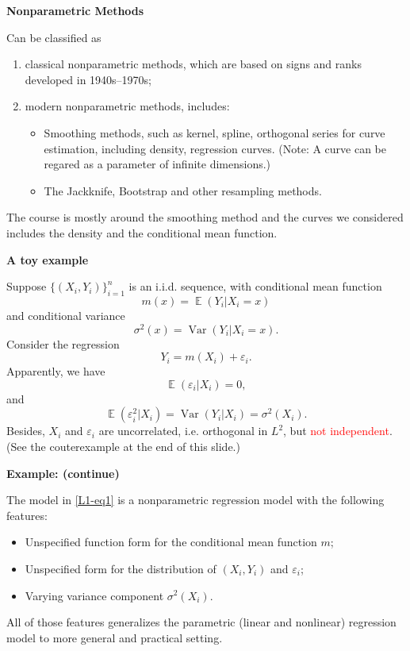 \documentclass[19pt,landscaoe]{article}
\DeclareMathOperator{\E}{\mathbb{E}}
\DeclareMathOperator{\Var}{\mathrm{Var}}
\begin{document}
\newpage
{\LARGE\centerline{\textbf{Nonparametric Methods}}}
\vskip25pt
\begin{minipage}{.9\textwidth}
    \Large Can be classified as 
\begin{enumerate}
\item classical nonparametric methods, which are based on signs and ranks developed in 1940s--1970s;
\item modern nonparametric methods, includes:
\begin{itemize}
    \item Smoothing methods, such as kernel, spline, orthogonal series for curve estimation, including density, regression curves. (Note: A curve can be regared as a parameter of infinite dimensions.)
    \item The Jackknife, Bootstrap and other resampling methods. 
\end{itemize}
\end{enumerate}
The course is mostly around the smoothing method and the curves we considered includes the density 
    and the conditional mean function.
\end{minipage}

\newpage
{\LARGE\centerline{\textbf{A toy example}}}
\vskip25pt
\begin{minipage}{.9\textwidth}
    \Large 
Suppose $\big\{(X_i,Y_i)\big\}_{i=1}^n$ is an i.i.d. sequence, with conditional mean function
$$m(x)=\E(Y_i|X_i=x)$$ 
and conditional variance $$\sigma^2(x)=\Var(Y_i|X_i=x).$$
Consider the regression 
\begin{equation}\label{L1-eq1}
    Y_i=m(X_i)+\varepsilon_i.
\end{equation}
Apparently, we have 
$$\E(\varepsilon_i|X_i)=0,$$ and
$$\E(\varepsilon_i^2|X_i)=\Var(Y_i|X_i)=\sigma^2(X_i).$$
Besides, $X_i$ and $\varepsilon_i$ are uncorrelated, i.e. orthogonal in $L^2$, but \textcolor{red}{not independent}.  (See the couterexample at the end of this slide.) 
\end{minipage}

\newpage
{\LARGE{\textbf{Example: (continue)}}}
\vskip25pt
\begin{minipage}{.9\textwidth}
    \Large 
The model in \eqref{L1-eq1} is a nonparametric regression model with the following features:
\begin{itemize}
    \item Unspecified function form for the conditional mean function $m$;
    \item Unspecified form for the distribution of $(X_i,Y_i)$ and $\varepsilon_i$;
    \item Varying variance component $\sigma^2(X_i)$.
\end{itemize}
All of those features generalizes the parametric (linear and nonlinear) regression model to more general and practical setting. 
\end{minipage}
\end{document}
